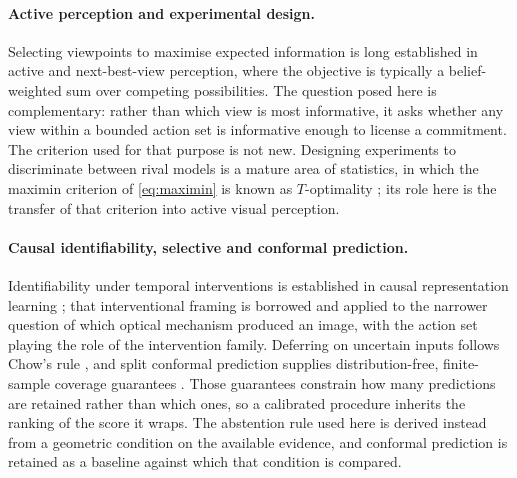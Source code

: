 \paragraph{Active perception and experimental design.}
Selecting viewpoints to maximise expected information is long established in
active and next-best-view perception, where the objective is typically a
belief-weighted sum over competing possibilities. The question posed here is
complementary: rather than which view is most informative, it asks whether any
view within a bounded action set is informative enough to license a commitment.
The criterion used for that purpose is not new. Designing experiments to
discriminate between rival models is a mature area of statistics, in which the
maximin criterion of \eqref{eq:maximin} is known as $T$-optimality
\citep{atkinson1975design,hunter1965experimental}; its role here is the transfer
of that criterion into active visual perception.

\paragraph{Causal identifiability, selective and conformal prediction.}
Identifiability under temporal interventions is established in causal
representation learning \citep{citris2022}; that interventional framing is
borrowed and applied to the narrower question of which optical mechanism produced
an image, with the action set playing the role of the intervention family.
Deferring on uncertain inputs follows Chow's rule \citep{chow1970}, and split
conformal prediction supplies distribution-free, finite-sample coverage guarantees
\citep{vovk2005,lei2018}. Those guarantees constrain how many predictions are
retained rather than which ones, so a calibrated procedure inherits the ranking of
the score it wraps. The abstention rule used here is derived instead from a
geometric condition on the available evidence, and conformal prediction is retained
as a baseline against which that condition is compared.
